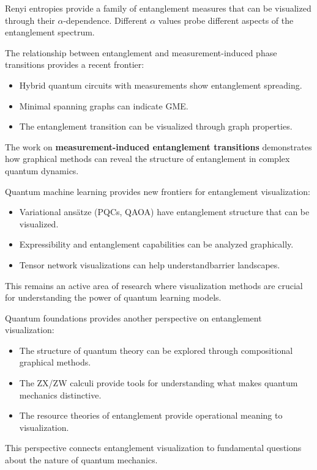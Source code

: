 \documentclass[%
 amsmath,amssymb,
 aps,
rmp,
]{revtex4-2}
\begin{document}
Renyi entropies provide a family of entanglement measures that can be visualized through their $\alpha$-dependence. Different $\alpha$ values probe different aspects of the entanglement spectrum.

The relationship between entanglement and measurement-induced phase transitions provides a recent frontier:
\begin{itemize}
	\item Hybrid quantum circuits with measurements show entanglement spreading.
	\item Minimal spanning graphs can indicate GME.
	\item The entanglement transition can be visualized through graph properties.
\end{itemize}

The work on \textbf{measurement-induced entanglement transitions} demonstrates how graphical methods can reveal the structure of entanglement in complex quantum dynamics.

Quantum machine learning provides new frontiers for entanglement visualization:
\begin{itemize}
	\item Variational ansätze (PQCs, QAOA) have entanglement structure that can be visualized.
	\item Expressibility and entanglement capabilities can be analyzed graphically.
	\item Tensor network visualizations can help understandbarrier landscapes.
\end{itemize}

This remains an active area of research where visualization methods are crucial for understanding the power of quantum learning models.

Quantum foundations provides another perspective on entanglement visualization:
\begin{itemize}
	\item The structure of quantum theory can be explored through compositional graphical methods.
	\item The ZX/ZW calculi provide tools for understanding what makes quantum mechanics distinctive.
	\item The resource theories of entanglement provide operational meaning to visualization.
\end{itemize}

This perspective connects entanglement visualization to fundamental questions about the nature of quantum mechanics.
\end{document}
